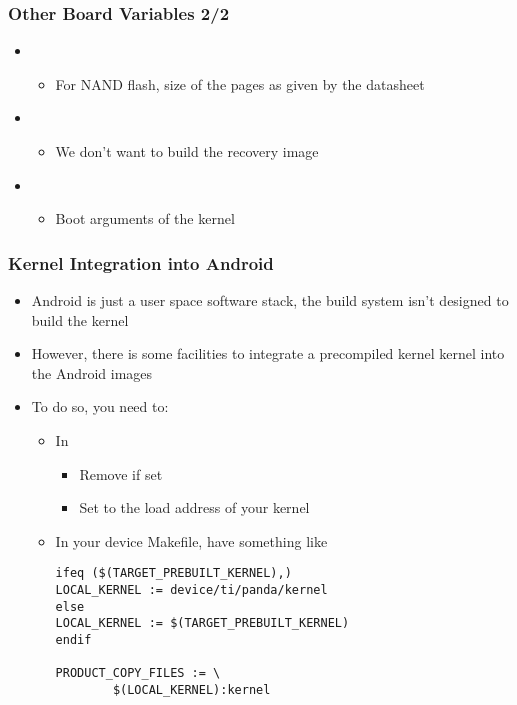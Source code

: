\begin{frame}
  \frametitle{Other Board Variables 2/2}
  \begin{itemize}
  \item {}
    \begin{itemize}
    \item For NAND flash, size of the pages as given by the datasheet
    \end{itemize}
  \item {}
    \begin{itemize}
    \item We don't want to build the recovery image
    \end{itemize}
  \item {}
    \begin{itemize}
    \item Boot arguments of the kernel
    \end{itemize}
  \end{itemize}
\end{frame}

\begin{frame}[fragile]
  \frametitle{Kernel Integration into Android}
  \begin{itemize}
  \item Android is just a user space software stack, the build system
    isn't designed to build the kernel
  \item However, there is some facilities to integrate a precompiled
    kernel kernel into the Android images
  \item To do so, you need to:
    \begin{itemize}
    \item In 
      \begin{itemize}
      \item Remove  if set
      \item Set  to the load address of your
        kernel
      \end{itemize}
    \item In your device Makefile, have something like
\begin{verbatim}
ifeq ($(TARGET_PREBUILT_KERNEL),)
LOCAL_KERNEL := device/ti/panda/kernel
else
LOCAL_KERNEL := $(TARGET_PREBUILT_KERNEL)
endif

PRODUCT_COPY_FILES := \
        $(LOCAL_KERNEL):kernel
\end{verbatim}
    \end{itemize}
  \end{itemize}
\end{frame}
